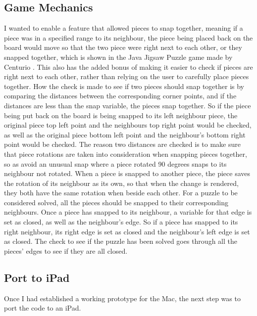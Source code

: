 \documentclass{article}
\begin{document}
\subsection{Game Mechanics}
I wanted to enable a feature that allowed pieces to snap together, meaning if a piece was in a specified range to its neighbour, the piece being placed back on the board would move so that the two piece were right next to each other, or they snapped together, which is shown in the Java Jigsaw Puzzle game made by Centurio \cite{ref:SourceJigsaw}. This also has the added bonus of making it easier to check if pieces are right next to each other, rather than relying on the user to carefully place pieces together. How the check is made to see if two pieces should snap together is by comparing the distances between the corresponding corner points, and if the distances are less than the snap variable, the pieces snap together. So if the piece being put back on the board is being snapped to its left neighbour piece, the original piece top left point and the neighbours top right point would be checked, as well as the original piece bottom left point and the neighbour's bottom right point would be checked. The reason two distances are checked is to make sure that piece rotations are taken into consideration when snapping pieces together, so as avoid an unusual snap where a piece rotated 90 degrees snaps to its neighbour not rotated. When a piece is snapped to another piece, the piece saves the rotation of its neighbour as its own, so that when the change is rendered, they both have the same rotation when beside each other. For a puzzle to be considered solved, all the pieces should be snapped to their corresponding neighbours. Once a piece has snapped to its neighbour, a variable for that edge is set as closed, as well as the neighbour's edge. So if a piece has snapped to its right neighbour, its right edge is set as closed and the neighbour's left edge is set as closed. The check to see if the puzzle has been solved goes through all the pieces' edges to see if they are all closed.

\subsection{Port to iPad}
Once I had established a working prototype for the Mac, the next step was to port the code to an iPad.
\end{document}
